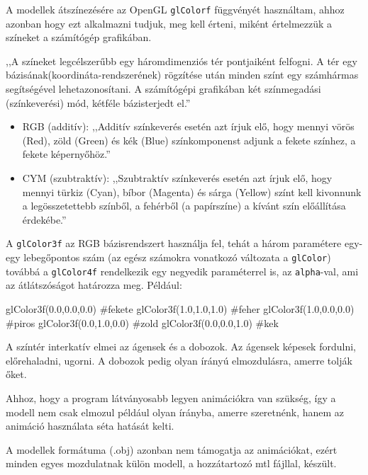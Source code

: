 
A modellek átszínezésére az OpenGL \texttt{glColorf} függvényét használtam, ahhoz azonban hogy ezt alkalmazni tudjuk, meg kell érteni, miként értelmezzük a színeket a számítógép grafikában.

,,A színeket legcélszerűbb egy háromdimenziós tér pontjaiként felfogni. A tér egy bázisának(koordináta-rendszerének) rögzítése után minden színt egy számhármas segítségével lehetazonosítani. A számítógépi grafikában két színmegadási (színkeverési) mód, kétféle bázisterjedt el.”
\begin{itemize}
\item  RGB (additív): ,,Additív színkeverés esetén azt írjuk elő, hogy mennyi vörös (Red), zöld (Green) és kék (Blue) színkomponenst adjunk a fekete színhez, a fekete képernyőhöz.”
\item CYM (szubtraktív): ,,Szubtraktív színkeverés esetén azt írjuk elő, hogy mennyi türkiz (Cyan), bíbor (Magenta) és sárga (Yellow) színt kell kivonnunk a legösszetettebb színből, a fehérből (a papírszíne) a kívánt szín előállítása érdekébe.”\cite{fenyek_szinek}
\end{itemize}

A \texttt{glColor3f} az RGB bázisrendszert használja fel, tehát a három paramétere egy-egy lebegőpontos szám (az egész számokra vonatkozó változata a \texttt{glColor}) továbbá a \texttt{glColor4f} rendelkezik egy negyedik paraméterrel is, az \texttt{alpha}-val, ami az átlátszóságot határozza meg.
Például: 
\begin{python}
glColor3f(0.0,0.0,0.0) #fekete
glColor3f(1.0,1.0,1.0) #feher
glColor3f(1.0,0.0,0.0) #piros
glColor3f(0.0,1.0,0.0) #zold
glColor3f(0.0,0.0,1.0) #kek
\end{python}


A színtér interkatív elmei az ágensek és a dobozok. 
Az ágensek képesek fordulni, előrehaladni, ugorni. 
A dobozok pedig olyan írányú elmozdulásra, amerre tolják őket.


Ahhoz, hogy a program látványosabb legyen animációkra van szükség, így a modell nem csak elmozul például olyan írányba, amerre szeretnénk, hanem az animáció használata séta hatását kelti.

A modellek formátuma (.obj) azonban nem támogatja az animációkat, ezért minden egyes mozdulatnak külön modell, a hozzátartozó mtl fájllal, készült.


